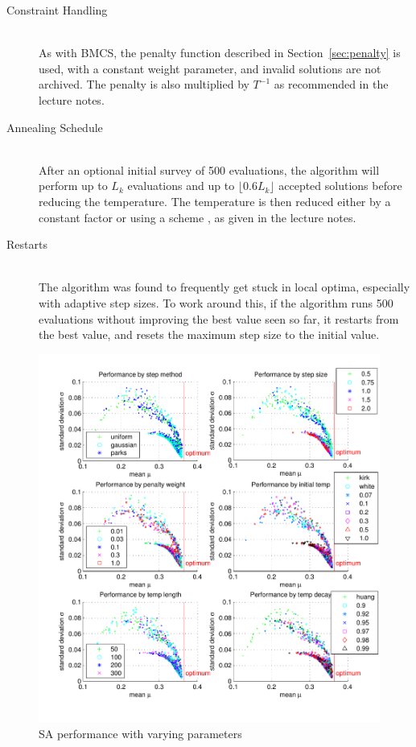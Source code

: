 \documentclass[10pt]{article}
\begin{document}
\begin{description}
  \item[Constraint Handling] \hfill \\
    As with BMCS, the penalty function described in Section~\ref{sec:penalty}
    is used, with a constant weight parameter, and invalid solutions are not
    archived. The penalty is also multiplied by $T^{-1}$ as recommended in the
    lecture notes.

  \item[Annealing Schedule] \hfill \\
    After an optional initial survey of 500 evaluations, the algorithm will
    perform up to $L_k$ evaluations and up to $\lfloor 0.6 L_k \rfloor$
    accepted solutions before reducing the temperature.  The temperature is
    then reduced either by a constant factor \cite{kirk82} or using a scheme
    \cite{huang86}, as given in the lecture notes.

  \item[Restarts] \hfill \\
    The algorithm was found to frequently get stuck in local optima,
    especially with adaptive step sizes. To work around this, if the algorithm
    runs 500 evaluations without improving the best value seen so far, it
    restarts from the best value, and resets the maximum step size to the
    initial value.

\end{description}

\begin{figure}
  \advance\leftskip-1cm
  \includegraphics[clip, trim=1cm 0.75cm 0cm 0.75cm, width=18.5cm]{sa_perf_scatters.pdf}
  \caption{SA performance with varying parameters}
  \label{fig:sa_perf_scatters}
  \end{figure}
\end{document}
